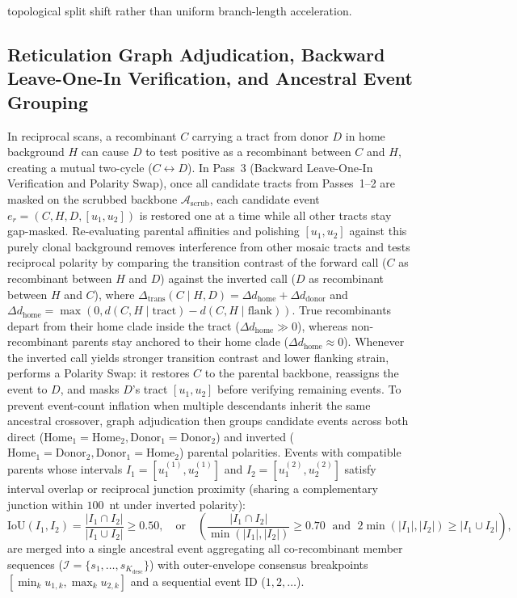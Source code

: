 topological split shift rather than uniform branch-length acceleration.

\subsection{Reticulation Graph Adjudication, Backward Leave-One-In Verification, and Ancestral Event Grouping}
\label{subsec:methods_adjudication}
In reciprocal scans, a recombinant $C$ carrying a tract from donor $D$ in home background $H$ can cause $D$ to test positive as a recombinant between $C$ and $H$, creating a mutual two-cycle ($C \leftrightarrow D$). In Pass~3 (Backward Leave-One-In Verification and Polarity Swap), once all candidate tracts from Passes~1--2 are masked on the scrubbed backbone $\mathcal{A}_{\mathrm{scrub}}$, each candidate event $e_r = (C, H, D, [u_1, u_2])$ is restored one at a time while all other tracts stay gap-masked. Re-evaluating parental affinities and polishing $[u_1, u_2]$ against this purely clonal background removes interference from other mosaic tracts and tests reciprocal polarity by comparing the transition contrast of the forward call ($C$ as recombinant between $H$ and $D$) against the inverted call ($D$ as recombinant between $H$ and $C$), where $\Delta_{\text{trans}}(C \mid H, D) = \Delta d_{\text{home}} + \Delta d_{\text{donor}}$ and $\Delta d_{\text{home}} = \max(0, d(C, H \mid \text{tract}) - d(C, H \mid \text{flank}))$. True recombinants depart from their home clade inside the tract ($\Delta d_{\text{home}} \gg 0$), whereas non-recombinant parents stay anchored to their home clade ($\Delta d_{\text{home}} \approx 0$). Whenever the inverted call yields stronger transition contrast and lower flanking strain, \RhizAeon performs a Polarity Swap: it restores $C$ to the parental backbone, reassigns the event to $D$, and masks $D$'s tract $[u_1, u_2]$ before verifying remaining events. To prevent event-count inflation when multiple descendants inherit the same ancestral crossover, graph adjudication then groups candidate events across both direct ($\text{Home}_1 = \text{Home}_2, \text{Donor}_1 = \text{Donor}_2$) and inverted ($\text{Home}_1 = \text{Donor}_2, \text{Donor}_1 = \text{Home}_2$) parental polarities. Events with compatible parents whose intervals $I_1 = [u_1^{(1)}, u_2^{(1)}]$ and $I_2 = [u_1^{(2)}, u_2^{(2)}]$ satisfy interval overlap or reciprocal junction proximity (sharing a complementary junction within $100$~nt under inverted polarity):
\begin{equation}
\mathrm{IoU}(I_1, I_2) = \frac{|I_1 \cap I_2|}{|I_1 \cup I_2|} \ge 0.50, \quad \text{or} \quad \left(\frac{|I_1 \cap I_2|}{\min(|I_1|, |I_2|)} \ge 0.70 \;\text{ and }\; 2\min(|I_1|, |I_2|) \ge |I_1 \cup I_2|\right),
\label{eq:methods_ancestral_overlap}
\end{equation}
are merged into a single ancestral event aggregating all co-recombinant member sequences ($\mathcal{I} = \{s_1, \dots, s_{K_{\mathrm{desc}}}\}$) with outer-envelope consensus breakpoints $[\min_k u_{1, k}, \max_k u_{2, k}]$ and a sequential event ID ($1, 2, \dots$).

